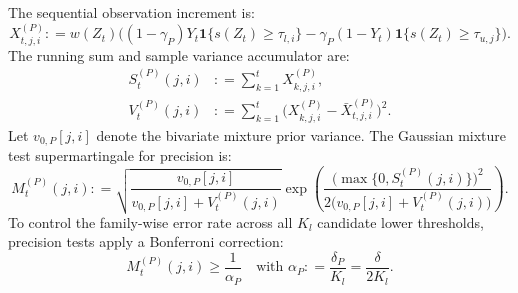 \documentclass[11pt,a4paper]{article}
\newcommand{\coloneqq}{\mathrel{\mathop:}=}
\begin{document}
The sequential observation increment is:
\begin{equation}\label{eq:obs_precision}
X_{t, j, i}^{(P)} \coloneqq w(Z_t) \Big( (1 - \gamma_P) Y_t \mathbf{1}\{s(Z_t) \ge \tau_{l, i}\} - \gamma_P (1 - Y_t) \mathbf{1}\{s(Z_t) \ge \tau_{u, j}\} \Big).
\end{equation}
The running sum and sample variance accumulator are:
\begin{align}
S_t^{(P)}(j, i) &\coloneqq \sum_{k=1}^t X_{k, j, i}^{(P)}, \label{eq:st_precision} \\
V_t^{(P)}(j, i) &\coloneqq \sum_{k=1}^t \big(X_{k, j, i}^{(P)} - \bar{X}_{t, j, i}^{(P)}\big)^2. \label{eq:vt_precision}
\end{align}
Let $v_{0, P}[j, i]$ denote the bivariate mixture prior variance. The Gaussian mixture test supermartingale for precision is:
\begin{equation}\label{eq:gm_precision}
M_t^{(P)}(j, i) \coloneqq \sqrt{\frac{v_{0, P}[j, i]}{v_{0, P}[j, i] + V_t^{(P)}(j, i)}} \exp\left( \frac{\big(\max\{0, S_t^{(P)}(j, i)\}\big)^2}{2\big(v_{0, P}[j, i] + V_t^{(P)}(j, i)\big)} \right).
\end{equation}
To control the family-wise error rate across all $K_l$ candidate lower thresholds, precision tests apply a Bonferroni correction:
\begin{equation}\label{eq:reject_precision}
M_t^{(P)}(j, i) \ge \frac{1}{\alpha_P} \quad \text{with } \alpha_P \coloneqq \frac{\delta_P}{K_l} = \frac{\delta}{2 K_l}.
\end{equation}
\end{document}
